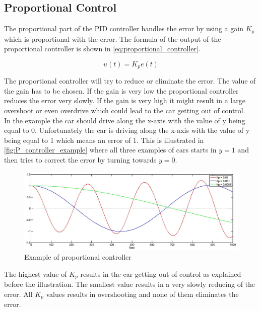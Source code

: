 \subsection{Proportional Control} %
\label{sub:proportional_control}

The proportional part of the PID controller handles the error by using a gain $K_p$ which is proportional with the error. The formula of the output of the proportional controller is shown in \autoref{eq:proportional_controller}.

\begin{equation}
\label{eq:proportional_controller}
u(t)=K_p e(t)
\end{equation}

The proportional controller will try to reduce or eliminate the error. The value of the gain has to be chosen. If the gain is very low the proportional controller reduces the error very slowly. If the gain is very high it might result in a large overshoot or even overdrive which could lead to the car getting out of control. \\

In the example the car should drive along the x-axis with the value of y being equal to 0. Unfortunately the car is driving along the x-axis with the value of y being equal to 1 which means an error of 1. This is illustrated in \autoref{fig:P_controller_example} where all three examples of cars starts in $y=1$ and then tries to correct the error by turning towards $y=0$. \\

\begin{figure}[H]
\centering
\includegraphics[scale=0.35]{images/Pcontroller.jpg}
\caption{Example of proportional controller}
\label{fig:P_controller_example}
\end{figure}

The highest value of $K_p$ results in the car getting out of control as explained before the illustration. The smallest value results in a very slowly reducing of the error. All $K_p$ values results in overshooting and none of them eliminates the error. \\

